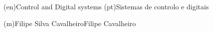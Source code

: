 %
%
%
%



%
%
%
%
\ntspecialization(en){Control and Digital systems}
\ntspecialization(pt){Sistemas de controlo e digitais}



%
%
\ntauthorname(m){Filipe Silva Cavalheiro}{Filipe Cavalheiro}



